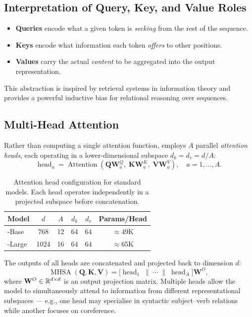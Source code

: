 \subsection{Interpretation of Query, Key, and Value Roles}
\label{subsec:attn_roles}

\begin{itemize}
  \item \textbf{Queries} encode what a given token is \emph{seeking} from the rest
        of the sequence.
  \item \textbf{Keys} encode what information each token \emph{offers} to other
        positions.
  \item \textbf{Values} carry the actual \emph{content} to be aggregated into the
        output representation.
\end{itemize}

\noindent This abstraction is inspired by retrieval systems in information theory and
provides a powerful inductive bias for relational reasoning over sequences.

\subsection{Multi-Head Attention}
\label{subsec:multihead}

Rather than computing a single attention function, \bert{} employs $A$ parallel
\emph{attention heads}, each operating in a lower-dimensional subspace
$d_k = d_v = d/A$:
\begin{equation}
  \operatorname{head}_a = \operatorname{Attention}(
    \mathbf{Q}\mathbf{W}_a^Q,\;
    \mathbf{K}\mathbf{W}_a^K,\;
    \mathbf{V}\mathbf{W}_a^V
  ), \quad a = 1, \ldots, A.
  \label{eq:head}
\end{equation}

\begin{table}[H]
  \centering
  \caption{Attention head configuration for standard \bert{} models.  Each head
           operates independently in a projected subspace before concatenation.}
  \label{tab:attention_heads}
  \renewcommand{\arraystretch}{1.3}
  \begin{tabular}{lccccc}
    \toprule
    \textbf{Model} & $d$ & $A$ & $d_k$ & $d_v$ & Params/Head \\
    \midrule
    \bert{}-Base  & 768  & 12 & 64  & 64  & $\approx$49K \\
    \bert{}-Large & 1024 & 16 & 64  & 64  & $\approx$65K \\
    \bottomrule
  \end{tabular}
\end{table}
The outputs of all heads are concatenated and projected back to dimension $d$:
\begin{equation}
  \operatorname{MHSA}(\mathbf{Q}, \mathbf{K}, \mathbf{V})
  = \bigl[\operatorname{head}_1 \;\|\; \cdots \;\|\; \operatorname{head}_A\bigr]
    \mathbf{W}^O,
  \label{eq:multihead}
\end{equation}
where $\mathbf{W}^O \in \mathbb{R}^{d \times d}$ is an output projection matrix.  Multiple
heads allow the model to simultaneously attend to information from different
representational subspaces --- e.g., one head may specialise in syntactic
subject–verb relations while another focuses on coreference.

